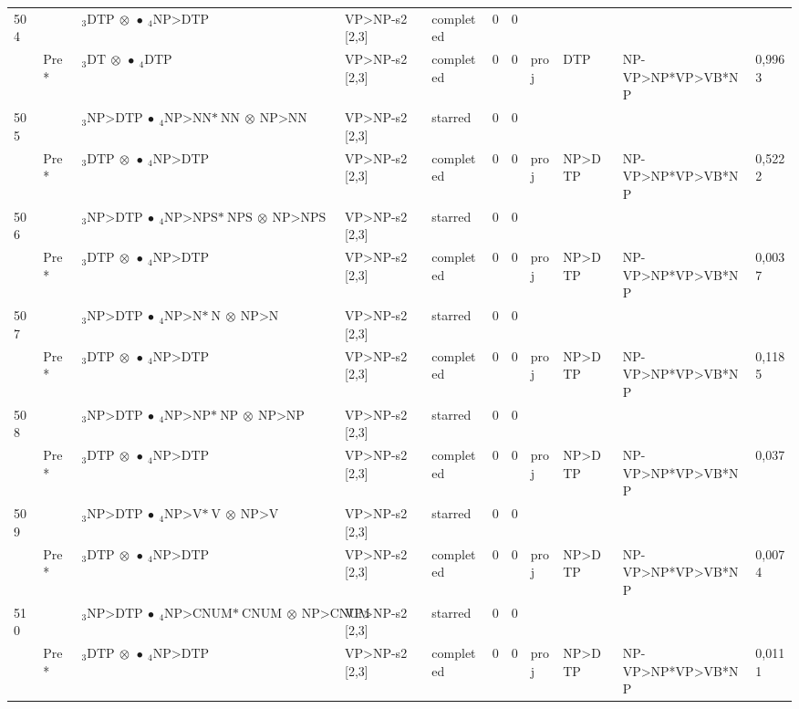 \documentclass[10pt]{article}
\begin{document}
\begin{longtable}[htbp]{lllllllllll}
504 & & $ {}_3 \textrm{DTP} \  \otimes \  \bullet \ {}_{4} \textrm{NP>DTP} $ & VP>NP-s2 [2,3] & completed & 0 & 0 & & & & \\ 
 & Pre *& $ {}_3 \textrm{DT} \  \otimes \  \bullet \ {}_{4} \textrm{DTP} $ & VP>NP-s2 [2,3] & completed & 0 & 0 & proj & DTP & NP-VP>NP*VP>VB*NP & 0,9963 \\ 
505 & & $ {}_3 \textrm{NP>DTP} \  \bullet \ {}_{4} \textrm{NP>NN*} \ \textrm{NN} \  \otimes \ \textrm{NP>NN} $ & VP>NP-s2 [2,3] & starred & 0 & 0 & & & & \\ 
 & Pre *& $ {}_3 \textrm{DTP} \  \otimes \  \bullet \ {}_{4} \textrm{NP>DTP} $ & VP>NP-s2 [2,3] & completed & 0 & 0 & proj & NP>DTP & NP-VP>NP*VP>VB*NP & 0,5222 \\ 
506 & & $ {}_3 \textrm{NP>DTP} \  \bullet \ {}_{4} \textrm{NP>NPS*} \ \textrm{NPS} \  \otimes \ \textrm{NP>NPS} $ & VP>NP-s2 [2,3] & starred & 0 & 0 & & & & \\ 
 & Pre *& $ {}_3 \textrm{DTP} \  \otimes \  \bullet \ {}_{4} \textrm{NP>DTP} $ & VP>NP-s2 [2,3] & completed & 0 & 0 & proj & NP>DTP & NP-VP>NP*VP>VB*NP & 0,0037 \\ 
507 & & $ {}_3 \textrm{NP>DTP} \  \bullet \ {}_{4} \textrm{NP>N*} \ \textrm{N} \  \otimes \ \textrm{NP>N} $ & VP>NP-s2 [2,3] & starred & 0 & 0 & & & & \\ 
 & Pre *& $ {}_3 \textrm{DTP} \  \otimes \  \bullet \ {}_{4} \textrm{NP>DTP} $ & VP>NP-s2 [2,3] & completed & 0 & 0 & proj & NP>DTP & NP-VP>NP*VP>VB*NP & 0,1185 \\ 
508 & & $ {}_3 \textrm{NP>DTP} \  \bullet \ {}_{4} \textrm{NP>NP*} \ \textrm{NP} \  \otimes \ \textrm{NP>NP} $ & VP>NP-s2 [2,3] & starred & 0 & 0 & & & & \\ 
 & Pre *& $ {}_3 \textrm{DTP} \  \otimes \  \bullet \ {}_{4} \textrm{NP>DTP} $ & VP>NP-s2 [2,3] & completed & 0 & 0 & proj & NP>DTP & NP-VP>NP*VP>VB*NP & 0,037 \\ 
509 & & $ {}_3 \textrm{NP>DTP} \  \bullet \ {}_{4} \textrm{NP>V*} \ \textrm{V} \  \otimes \ \textrm{NP>V} $ & VP>NP-s2 [2,3] & starred & 0 & 0 & & & & \\ 
 & Pre *& $ {}_3 \textrm{DTP} \  \otimes \  \bullet \ {}_{4} \textrm{NP>DTP} $ & VP>NP-s2 [2,3] & completed & 0 & 0 & proj & NP>DTP & NP-VP>NP*VP>VB*NP & 0,0074 \\ 
510 & & $ {}_3 \textrm{NP>DTP} \  \bullet \ {}_{4} \textrm{NP>CNUM*} \ \textrm{CNUM} \  \otimes \ \textrm{NP>CNUM} $ & VP>NP-s2 [2,3] & starred & 0 & 0 & & & & \\ 
 & Pre *& $ {}_3 \textrm{DTP} \  \otimes \  \bullet \ {}_{4} \textrm{NP>DTP} $ & VP>NP-s2 [2,3] & completed & 0 & 0 & proj & NP>DTP & NP-VP>NP*VP>VB*NP & 0,0111 \\ 

\end{longtable}
\end{document}
